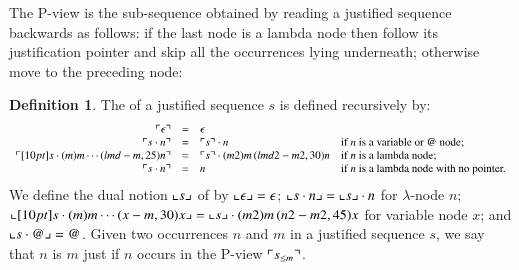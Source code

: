 \documentclass{elsarticle}
\theoremstyle{plain}
\theoremstyle{definition}
\newtheorem{definition}{Definition}[section]
\begin{document}
The P-view is the sub-sequence obtained by reading a justified sequence backwards as follows: if the last node is a lambda node then follow its justification pointer and skip all the occurrences lying underneath; otherwise move to the preceding node:
\begin{definition}
\label{def:views}
The  of a justified sequence $s$ is defined recursively by:
$$\begin{array}{rcll}
 \pview{\epsilon} &=&  \epsilon \\
 \pview{s \cdot n }  &=&  \pview{s} \cdot n
    & \mbox{if $n$ is a variable or $@$ node;}
    \\
 \pview{\Pstr[10pt]{ s \cdot (m){m} \cdots (lmd-m,25){n}}} &=&
        \Pstr{ \pview{s} \cdot (m2){m} \, (lmd2-m2,30){n} }
    & \mbox{if $n$ is a lambda node;}
    \\
 \pview{s \cdot n }  &=&  n & \mbox{if $n$ is a lambda node with no pointer.}
\end{array}$$
%
We define the dual notion $\llcorner s \lrcorner$ of  by
$\llcorner \epsilon \lrcorner = \epsilon$;
$\llcorner s \cdot n  \lrcorner  =  \llcorner s \lrcorner \cdot n$ for $\lambda$-node $n$;
$\oview{\Pstr[10pt]{s \cdot (m){m} \cdots (x-m,30){x}}}= \Pstr{ \oview{s} \cdot (m2){m} \, (n2-m2,45){x} }$ for variable node $x$; and $\llcorner s \cdot @  \lrcorner = @$.
%
%
Given two occurrences $n$ and $m$ in a justified sequence $s$, we say that $n$ is  $m$ just if $n$ occurs in the P-view $\ulcorner s_{\leq m} \urcorner$.
\end{definition}

\end{document}
